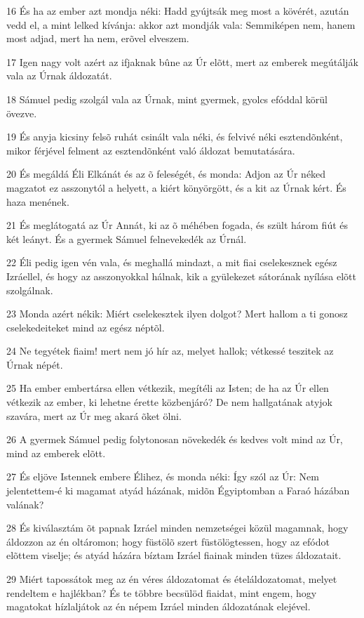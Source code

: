 \par 16 És ha az ember azt mondja néki: Hadd gyújtsák meg most a kövérét, azután vedd el, a mint lelked kívánja: akkor azt mondják vala: Semmiképen nem, hanem most adjad, mert ha nem, erõvel elveszem.
\par 17 Igen nagy volt azért az ifjaknak bûne az Úr elõtt, mert az emberek megútálják vala az Úrnak áldozatát.
\par 18 Sámuel pedig szolgál vala az Úrnak, mint gyermek, gyolcs efóddal körül övezve.
\par 19 És anyja kicsiny felsõ ruhát csinált vala néki, és felvivé néki esztendõnként, mikor férjével felment az esztendõnként való áldozat bemutatására.
\par 20 És megáldá Éli Elkánát és az õ feleségét, és monda: Adjon az Úr néked magzatot ez asszonytól a helyett, a kiért könyörgött, és a kit az Úrnak kért. És haza menének.
\par 21 És meglátogatá az Úr Annát, ki az õ méhében fogada, és szült három fiút és két leányt. És a gyermek Sámuel felnevekedék az Úrnál.
\par 22 Éli pedig igen vén vala, és meghallá mindazt, a mit fiai cselekesznek egész Izráellel, és hogy az asszonyokkal hálnak, kik a gyülekezet sátorának nyílása elõtt szolgálnak.
\par 23 Monda azért nékik: Miért cselekesztek ilyen dolgot? Mert hallom a ti gonosz cselekedeiteket mind az egész néptõl.
\par 24 Ne tegyétek fiaim! mert nem jó hír az, melyet hallok; vétkessé teszitek az Úrnak népét.
\par 25 Ha ember embertársa ellen vétkezik, megítéli az Isten; de ha az Úr ellen vétkezik az ember, ki lehetne érette közbenjáró? De nem hallgatának atyjok szavára, mert az Úr meg akará õket ölni.
\par 26 A gyermek Sámuel pedig folytonosan növekedék és kedves volt mind az Úr, mind az emberek elõtt.
\par 27 És eljöve Istennek embere Élihez, és monda néki: Így szól az Úr: Nem jelentettem-é ki magamat atyád házának, midõn Égyiptomban a Faraó házában valának?
\par 28 És kiválasztám õt papnak Izráel minden nemzetségei közül magamnak, hogy áldozzon az én oltáromon; hogy füstölõ szert füstölögtessen, hogy az efódot elõttem viselje; és atyád házára bíztam Izráel fiainak minden tüzes áldozatait.
\par 29 Miért tapossátok meg az én véres áldozatomat és ételáldozatomat, melyet rendeltem e hajlékban? És te többre becsülöd fiaidat, mint engem, hogy magatokat hízlaljátok az én népem Izráel minden áldozatának elejével.
